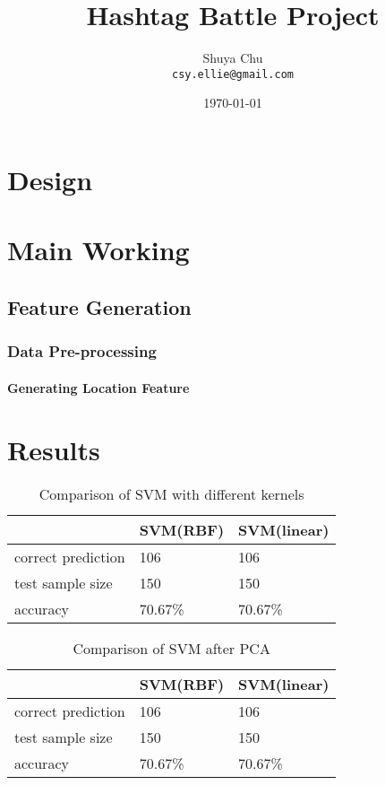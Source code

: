 \documentclass[11pt,letterpaper]{article}
\title{Hashtag Battle Project}
\author{Shuya Chu\\
  {\tt csy.ellie@gmail.com}
}
\date{\today}
\begin{document}
\maketitle


\section{Design}




\section{Main Working}
\subsection{Feature Generation}

\subsubsection{Data Pre-processing}
\paragraph{Generating Location Feature}

\section{Results}
\label{sec:results}

\begin{center}
   \begin{table}[h]
    \begin{tabular}{ | l | l  | p{2cm} |}
    \hline
     & SVM(RBF) & SVM(linear) \\ \hline
    correct prediction& 106 & 106  \\ \hline
    test sample size& 150 &150  \\ \hline
    accuracy & 70.67\% &70.67\%\\ \hline
    \end{tabular}
    \caption{Comparison of SVM with different kernels}
    \end{table}
\end{center}

\begin{center}
   \begin{table}[h]
    \begin{tabular}{ | l | l  | p{2cm} |}
    \hline
     & SVM(RBF) & SVM(linear) \\ \hline
    correct prediction& 106 & 106  \\ \hline
    test sample size& 150 &150  \\ \hline
    accuracy & 70.67\% &70.67\%\\ \hline
    \end{tabular}
    \caption{Comparison of SVM after PCA}
    \end{table}
\end{center}
\end{document}
